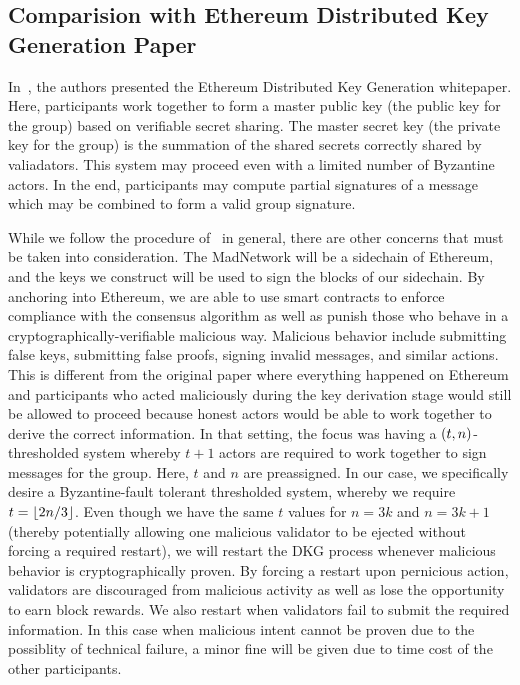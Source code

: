 \subsection{Comparision with Ethereum Distributed Key Generation Paper}
\label{ssec:ethdkg_comparison}

In~\cite{ethdkg}, the authors presented the Ethereum
Distributed Key Generation whitepaper.
Here, participants work together to form a master public key
(the public key for the group)
based on verifiable secret sharing.
The master secret key (the private key for the group)
is the summation of the shared secrets correctly shared by
valiadators.
This system may proceed even with a limited number of Byzantine actors.
In the end, participants may compute partial signatures of a message
which may be combined to form a valid group signature.

While we follow the procedure of~\cite{ethdkg} in general,
there are other concerns that must be taken into consideration.
The MadNetwork will be a sidechain of Ethereum,
and the keys we construct will be used to sign the blocks of our sidechain.
By anchoring into Ethereum, we are able to use smart contracts to enforce
compliance with the consensus algorithm as well as punish
those who behave in a cryptographically-verifiable malicious way.
Malicious behavior include submitting false keys, submitting
false proofs, signing invalid messages, and similar actions.
This is different from the original paper where everything
happened on Ethereum and participants who
acted maliciously during the key derivation stage would still
be allowed to proceed because honest actors would be able to
work together to derive the correct information.
In that setting, the focus was having a $\left( t,n \right)$-thresholded
system whereby $t+1$ actors are required to work together to
sign messages for the group.
Here, $t$ and $n$ are preassigned.
In our case, we specifically desire a Byzantine-fault tolerant
thresholded system, whereby we require $t = \left\lfloor 2n/3 \right\rfloor$.
Even though we have the same $t$ values for $n = 3k$ and $n = 3k+1$
(thereby potentially allowing one malicious validator to be
ejected without forcing a required restart),
we will restart the DKG process whenever malicious behavior
is cryptographically proven.
By forcing a restart upon pernicious action,
validators are discouraged from malicious activity as well
as lose the opportunity to earn block rewards.
We also restart when validators fail to submit the required
information.
In this case when malicious intent cannot be proven due to
the possiblity of technical failure, a minor fine will be
given due to time cost of the other participants.

